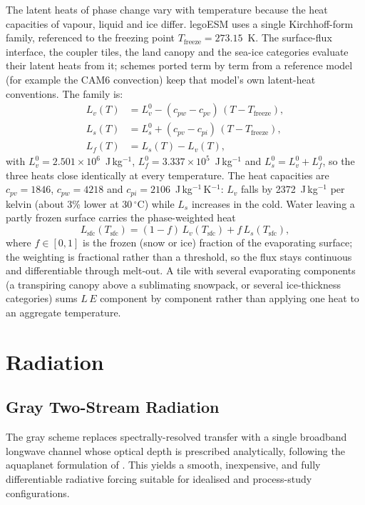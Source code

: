 \documentclass[11pt,twoside]{report}
\newcommand{\Lv}{L_v}
\newcommand{\Ls}{L_s}
\newcommand{\Lf}{L_f}
\begin{document}
The latent heats of phase change vary with temperature because the heat
capacities of vapour, liquid and ice differ.  legoESM uses a single
Kirchhoff-form family, referenced to the freezing point
$T_{\mathrm{freeze}}=273.15$~K.  The surface-flux interface, the coupler
tiles, the land canopy and the sea-ice categories evaluate their latent heats
from it; schemes ported term by term from a reference model (for example
the CAM6 convection) keep that model's own latent-heat conventions.  The family is:
\begin{align}
  \Lv(T) &= \Lv^{0} - (c_{pw}-c_{pv})\,(T-T_{\mathrm{freeze}}),\\
  \Ls(T) &= \Ls^{0} + (c_{pv}-c_{pi})\,(T-T_{\mathrm{freeze}}),\\
  \Lf(T) &= \Ls(T)-\Lv(T),
\end{align}
with $\Lv^{0}=2.501\times10^{6}$~J\,kg$^{-1}$,
$\Lf^{0}=3.337\times10^{5}$~J\,kg$^{-1}$ and $\Ls^{0}=\Lv^{0}+\Lf^{0}$, so
the three heats close identically at every temperature.  The heat capacities
are $c_{pv}=1846$, $c_{pw}=4218$ and $c_{pi}=2106$~J\,kg$^{-1}$\,K$^{-1}$:
$\Lv$ falls by 2372~J\,kg$^{-1}$ per kelvin (about 3\% lower at
30\,$^\circ$C) while $\Ls$ increases in the cold.  Water leaving a partly
frozen surface carries the phase-weighted heat
\begin{equation}
  L_{\mathrm{sfc}}(T_{\mathrm{sfc}}) = (1-f)\,\Lv(T_{\mathrm{sfc}})
  + f\,\Ls(T_{\mathrm{sfc}}),
\end{equation}
where $f\in[0,1]$ is the frozen (snow or ice) fraction of the evaporating
surface; the weighting is fractional rather than a threshold, so the flux stays
continuous and differentiable through melt-out.  A tile with several
evaporating components (a transpiring canopy above a sublimating snowpack, or
several ice-thickness categories) sums $L\,E$ component by component rather
than applying one heat to an aggregate temperature.


\section{Radiation}
\label{sec:radiation}

\subsection{Gray Two-Stream Radiation}
\label{sec:gray-rad}

The gray scheme replaces spectrally-resolved transfer with a single
broadband longwave channel whose optical depth is prescribed analytically,
following the aquaplanet formulation of \citet{Frierson2006}. This yields a
smooth, inexpensive, and fully differentiable radiative forcing suitable for
idealised and process-study configurations.
\end{document}
